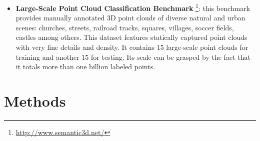 \begin{itemize}

	\item \textbf{Large-Scale Point Cloud Classification Benchmark} \cite{hackel2016contour}\footnote{\url{http://www.semantic3d.net/}}: this benchmark provides manually annotated 3D point clouds of diverse natural and urban scenes: churches, streets, railroad tracks, squares, villages, soccer fields, castles among others. This dataset features statically captured point clouds with very fine details and density. It contains $15$ large-scale point clouds for training and another $15$ for testing. Its scale can be grasped by the fact that it totals more than one billion labeled points.
\end{itemize}

\section{Methods}
\label{cha:semseg:sec:methods}

